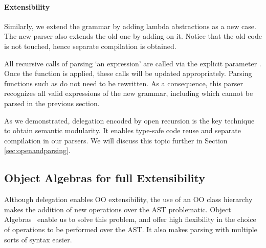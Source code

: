 
\paragraph{Extensibility} Similarly, we extend the grammar by adding lambda abstractions as a new case. The new parser also extends the old one by adding  on it. Notice that the old code is not touched, hence separate compilation is obtained.



All recursive calls of parsing `an expression' are called via the explicit parameter . Once the  function is applied, these calls will be updated appropriately. Parsing functions such as  do not need to be rewritten. As a consequence, this parser recognizes all valid expressions of the new grammar, including   which cannot be parsed in the previous section.


As we demonstrated, delegation encoded by open recursion is the key technique to obtain semantic modularity. It enables type-safe code reuse and separate compilation in our parsers. We will discuss this topic further in Section \ref{sec:openandparsing}.

\subsection{Object Algebras for full Extensibility}\label{subsec:overview-oa}

Although delegation enables OO extensibility, the use of an OO class
hierarchy makes the addition of new operations over the AST
problematic. Object Algebras~\cite{Oliveira2012} enable us to solve this problem, and
offer high flexibility in the choice of operations to be performed
over the AST. It also makes parsing with multiple sorts of syntax easier.

